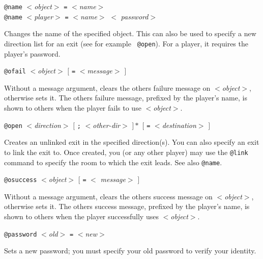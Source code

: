 \begin{simple}
\dorule

\item[]
\begin{flushleft}
{\tt @name} $<${\em object\/}$>$ \verb|=| $<${\em name\/}$>$ \\
{\tt @name} $<${\em player\/}$>$ \verb|=| $<${\em name\/}$>$ $<${\em
password\/}$>$
\end{flushleft}
Changes the name of the specified object.  This can also be used to
specify a new direction list for an exit (see for example {\tt
@open\/}).  For a player, it requires the player's password.

\dorule

\item[]
\begin{flushleft}
{\tt @ofail} $<${\em object\/}$>$ $[$ \verb|=| $<${\em message\/}$>$
$]$
\end{flushleft}
Without a message argument, clears the others failure message on
$<${\em object\/}$>$, otherwise sets it.  The others failure message,
prefixed by the player's name, is shown to others when the player
fails to use $<${\em object\/}$>$.

\dorule

\item[]
\begin{flushleft}
{\tt @open} $<${\em direction\/}$>$ $[$ {\tt;} $<${\em other-dir\/}$>$
$]*$ $[$ {\tt =} $<${\em destination\/}$>$ $]$
\end{flushleft}
Creates an unlinked exit in the specified direction(s).  You can also
specify an exit to link the exit to.  Once created, you (or any other
player) may use the {\tt @link} command to specify the room to which
the exit leads.  See also {\tt @name}.

\dorule

\item[]
\begin{flushleft}
{\tt @osuccess} $<${\em object\/}$>$ $[$ \verb|=| $<${\em
message\/}$>$ $]$
\end{flushleft}
Without a message argument, clears the others success message on
$<${\em object\/}$>$, otherwise sets it.  The others success message,
prefixed by the player's name, is shown to others when the player
successfully uses $<${\em object\/}$>$.

\dorule

\item[]
\begin{flushleft}
{\tt @password} $<${\em old\/}$>$ \verb|=| $<${\em new\/}$>$
\end{flushleft}
Sets a new password; you must specify your old password to verify your
identity.


\end{simple}
